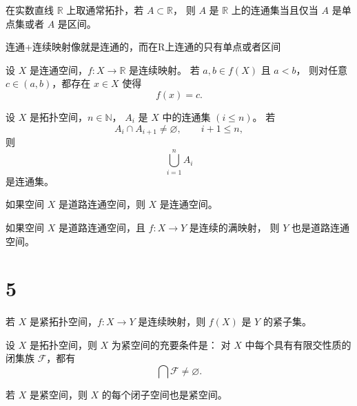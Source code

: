 \begin{theorem}[定理 4.6（实数直线上连通集）]
在实数直线 $\mathbb{R}$ 上取通常拓扑，若 $A\subset\mathbb{R}$，
则 $A$ 是 $\mathbb{R}$ 上的连通集当且仅当 $A$ 是单点集或者 $A$ 是区间。
\end{theorem}
\begin{dxtips}
    连通+连续映射像就是连通的，而在R上连通的只有单点或者区间
\end{dxtips}
\begin{theorem}
设 $X$ 是连通空间，$f:X\to\mathbb{R}$ 是连续映射。
若 $a,b\in f(X)$ 且 $a<b$，
则对任意 $c\in(a,b)$，都存在 $x\in X$ 使得
\[
f(x)=c.
\]
\end{theorem}

\begin{lemma}
设 $X$ 是拓扑空间，$n\in\mathbb{N}$，
$A_i$ 是 $X$ 中的连通集 $(i\le n)$。
若
\[
A_i\cap A_{i+1}\neq\varnothing,\qquad i+1\le n,
\]
则
\[
\bigcup_{i=1}^n A_i
\]
是连通集。
\end{lemma}

\begin{theorem}
如果空间 $X$ 是道路连通空间，则 $X$ 是连通空间。
\end{theorem}

\begin{theorem}
如果空间 $X$ 是道路连通空间，且
$f:X\to Y$ 是连续的满映射，
则 $Y$ 也是道路连通空间。
\end{theorem}
\section{5}
\begin{theorem}
若 $X$ 是紧拓扑空间，$f:X\to Y$ 是连续映射，则 $f(X)$ 是 $Y$ 的紧子集。
\end{theorem}

\begin{theorem}
设 $X$ 是拓扑空间，则 $X$ 为紧空间的充要条件是：
对 $X$ 中每个具有有限交性质的闭集族 $\mathcal{F}$，都有
\[
\bigcap \mathcal{F}\neq\varnothing.
\]
\end{theorem}

\begin{theorem}[定理 5.4（闭子空间继承紧）]
若 $X$ 是紧空间，则 $X$ 的每个闭子空间也是紧空间。
\end{theorem}

